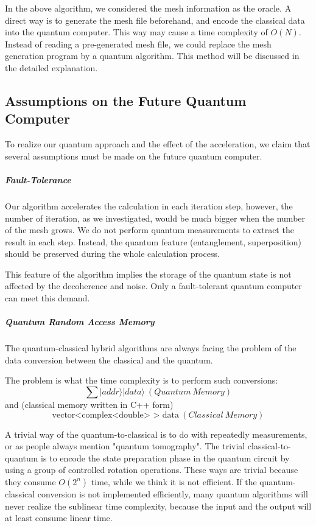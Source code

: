 \documentclass[%
 reprint,
 amsmath,amssymb,
pra,
]{revtex4-1}
\begin{document}
In the above algorithm, we considered the mesh information as the oracle. A direct way is to generate the mesh file beforehand, and encode the classical data into the quantum computer. This way may cause a time complexity of $O(N)$. Instead of reading a pre-generated mesh file, we could replace the mesh generation program by a quantum algorithm. This method will be discussed in the detailed explanation.

\subsection{Assumptions on the Future Quantum Computer}

To realize our quantum approach and the effect of the acceleration, we claim that several assumptions must be made on the future quantum computer.

\subparagraph{Fault-Tolerance}
Our algorithm accelerates the calculation in each iteration step, however, the number of iteration, as we investigated, would be much bigger when the number of the mesh grows. We do not perform quantum measurements to extract the result in each step. Instead, the quantum feature (entanglement, superposition) should be preserved during the whole calculation process. 

This feature of the algorithm implies the storage of the quantum state is not affected by the decoherence and noise. Only a fault-tolerant quantum computer can meet this demand.

\subparagraph{Quantum Random Access Memory}
The quantum-classical hybrid algorithms are always facing the problem of the data conversion between the classical and the quantum.

The problem is what the time complexity is to perform such conversions:
$$ \sum|addr\rangle|data\rangle\ (Quantum\ Memory) $$
and (classical memory written in C++ form)
$$ \text{vector<complex<double> > data}\ (Classical\ Memory) $$

A trivial way of the quantum-to-classical is to do with repeatedly measurements, or as people always mention "quantum tomography". The trivial classical-to-quantum is to encode the state preparation phase in the quantum circuit by using a group of controlled rotation operations. These ways are trivial because they consume $O(2^n)$ time, while we think it is not efficient. If the quantum-classical conversion is not implemented efficiently, many quantum algorithms will never realize the sublinear time complexity, because the input and the output will at least consume linear time.
\end{document}
